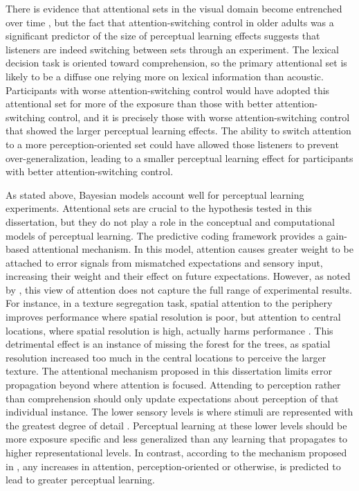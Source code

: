 There is evidence that attentional sets in the visual domain become entrenched over time \cite{Leber2006}, but the fact that attention-switching control in older adults was a significant predictor of the size of perceptual learning effects \citep{Scharenborg2014} suggests that listeners are indeed switching between sets through an experiment.
The lexical decision task is oriented toward comprehension, so the primary attentional set is likely to be a diffuse one relying more on lexical information than acoustic.
Participants with worse attention-switching control would have adopted this attentional set for more of the exposure than those with better attention-switching control, and it is precisely those with worse attention-switching control that showed the larger perceptual learning effects.
The ability to switch attention to a more perception-oriented set could have allowed those listeners to prevent over-generalization, leading to a smaller perceptual learning effect for participants with better attention-switching control.

As stated above, Bayesian models account well for perceptual learning experiments.
Attentional sets are crucial to the hypothesis tested in this dissertation, but they do not play a role in the conceptual and computational models of perceptual learning.
The predictive coding framework \citep{Clark2013} provides a gain-based attentional mechanism. 
In this model, attention causes greater weight to be attached to error signals from mismatched expectations and sensory input, increasing their weight and their effect on future expectations.  
However, as noted by \citet{Block2013}, this view of attention does not capture the full range of experimental results.  
For instance, in a texture segregation task, spatial attention to the periphery improves performance where spatial resolution is poor, but attention to central locations, where spatial resolution is high, actually harms performance \citep{Yeshurun1998}.  
This detrimental effect is an instance of missing the forest for the trees, as spatial resolution increased too much in the central locations to perceive the larger texture.  
The attentional mechanism proposed in this dissertation limits error propagation beyond where attention is focused.
Attending to perception rather than comprehension should only update expectations about perception of that individual instance.
The lower sensory levels is where stimuli are represented with the greatest degree of detail \citep{Gilbert2001}.
Perceptual learning at these lower levels should be more exposure specific and less generalized than any learning that propagates to higher representational levels.
In contrast, according to the mechanism proposed in \citet{Clark2013}, any increases in attention, perception-oriented or otherwise, is predicted to lead to greater perceptual learning.


